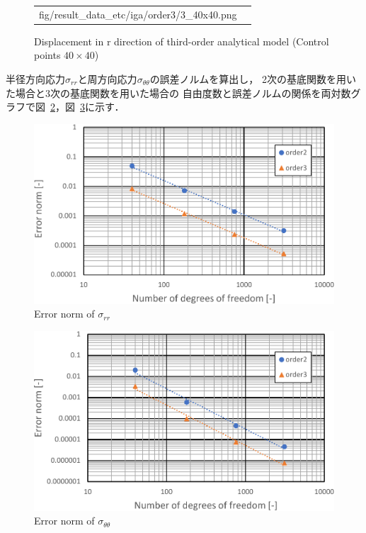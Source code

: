 \begin{figure}[htbp]
\begin{tabular}{cc}
\begin{minipage}[t]{0.45\hsize}
      {fig/result_data_etc/iga/order3/3_40x40.png}
      \caption{Displacement in r direction of third-order analytical model (Control points $40\times 40$)}
      \label{fig:iga 04}
    \end{minipage}
  \end{tabular}
\end{figure}

半径方向応力$\sigma_{rr}$と周方向応力$\sigma_{\theta\theta}$の誤差ノルムを算出し，
2次の基底関数を用いた場合と3次の基底関数を用いた場合の
自由度数と誤差ノルムの関係を両対数グラフで図~\ref{fig:iga ER 01}，図~\ref{fig:iga ER 02}に示す．

\begin{figure}[htbp]
  \centering
  \includegraphics[keepaspectratio, scale = 0.8]
  {fig/result_data_etc/iga/ER01-crop.pdf}
  \caption{Error norm of $\sigma_{rr}$}
  \label{fig:iga ER 01}
\end{figure}

\begin{figure}[htbp]
  \centering
  \includegraphics[keepaspectratio, scale = 0.8]
  {fig/result_data_etc/iga/ER02-crop.pdf}
  \caption{Error norm of $\sigma_{\theta\theta}$}
  \label{fig:iga ER 02}
\end{figure}

